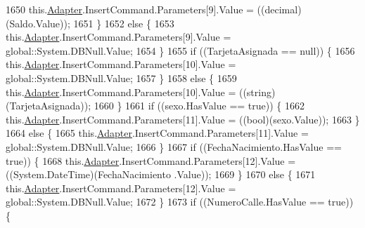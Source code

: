 \begin{DoxyCode}
1650                 this.\hyperlink{class_proyecto___integrador__3_1_1ds_usuarios_table_adapters_1_1_usuarios_table_adapter_a46252bad9dadbf20130beca25d50b5bc}{Adapter}.InsertCommand.Parameters[9].Value = ((decimal)(Saldo.Value));
1651             \}
1652             \textcolor{keywordflow}{else} \{
1653                 this.\hyperlink{class_proyecto___integrador__3_1_1ds_usuarios_table_adapters_1_1_usuarios_table_adapter_a46252bad9dadbf20130beca25d50b5bc}{Adapter}.InsertCommand.Parameters[9].Value = global::System.DBNull.Value;
1654             \}
1655             \textcolor{keywordflow}{if} ((TarjetaAsignada == null)) \{
1656                 this.\hyperlink{class_proyecto___integrador__3_1_1ds_usuarios_table_adapters_1_1_usuarios_table_adapter_a46252bad9dadbf20130beca25d50b5bc}{Adapter}.InsertCommand.Parameters[10].Value = global::System.DBNull.Value;
1657             \}
1658             \textcolor{keywordflow}{else} \{
1659                 this.\hyperlink{class_proyecto___integrador__3_1_1ds_usuarios_table_adapters_1_1_usuarios_table_adapter_a46252bad9dadbf20130beca25d50b5bc}{Adapter}.InsertCommand.Parameters[10].Value = ((string)(TarjetaAsignada));
1660             \}
1661             \textcolor{keywordflow}{if} ((sexo.HasValue == \textcolor{keyword}{true})) \{
1662                 this.\hyperlink{class_proyecto___integrador__3_1_1ds_usuarios_table_adapters_1_1_usuarios_table_adapter_a46252bad9dadbf20130beca25d50b5bc}{Adapter}.InsertCommand.Parameters[11].Value = ((bool)(sexo.Value));
1663             \}
1664             \textcolor{keywordflow}{else} \{
1665                 this.\hyperlink{class_proyecto___integrador__3_1_1ds_usuarios_table_adapters_1_1_usuarios_table_adapter_a46252bad9dadbf20130beca25d50b5bc}{Adapter}.InsertCommand.Parameters[11].Value = global::System.DBNull.Value;
1666             \}
1667             \textcolor{keywordflow}{if} ((FechaNacimiento.HasValue == \textcolor{keyword}{true})) \{
1668                 this.\hyperlink{class_proyecto___integrador__3_1_1ds_usuarios_table_adapters_1_1_usuarios_table_adapter_a46252bad9dadbf20130beca25d50b5bc}{Adapter}.InsertCommand.Parameters[12].Value = ((System.DateTime)(FechaNacimiento
      .Value));
1669             \}
1670             \textcolor{keywordflow}{else} \{
1671                 this.\hyperlink{class_proyecto___integrador__3_1_1ds_usuarios_table_adapters_1_1_usuarios_table_adapter_a46252bad9dadbf20130beca25d50b5bc}{Adapter}.InsertCommand.Parameters[12].Value = global::System.DBNull.Value;
1672             \}
1673             \textcolor{keywordflow}{if} ((NumeroCalle.HasValue == \textcolor{keyword}{true})) \{

\end{DoxyCode}
